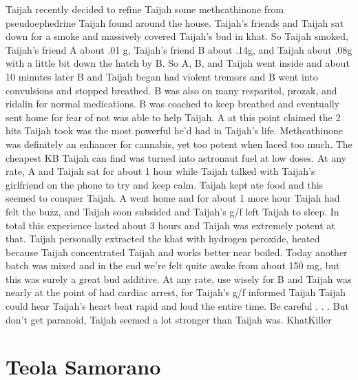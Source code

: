 \documentclass[12pt]{book}
\begin{document}
Taijah recently decided to refine Taijah some methcathinone from pseudoephedrine Taijah found around the house. Taijah's friends and Taijah sat down for a smoke and massively covered Taijah's bud in khat. So Taijah smoked, Taijah's friend A about .01 g, Taijah's friend B about .14g, and Taijah about .08g with a little bit down the hatch by B. So A, B, and Taijah went inside and about 10 minutes later B and Taijah began had violent tremors and B went into convulsions and stopped breathed. B was also on many resparitol, prozak, and ridalin for normal medications. B was coached to keep breathed and eventually sent home for fear of not was able to help Taijah. A at this point claimed the 2 hits Taijah took was the most powerful he'd had in Taijah's life. Methcathinone was definitely an enhancer for cannabis, yet too potent when laced too much. The cheapest KB Taijah can find was turned into astronaut fuel at low doses. At any rate, A and Taijah sat for about 1 hour while Taijah talked with Taijah's girlfriend on the phone to try and keep calm. Taijah kept ate food and this seemed to conquer Taijah. A went home and for about 1 more hour Taijah had felt the buzz, and Taijah soon subsided and Taijah's g/f left Taijah to sleep. In total this experience lasted about 3 hours and Taijah was extremely potent at that. Taijah personally extracted the khat with hydrogen peroxide, heated because Taijah concentrated Taijah and works better near boiled. Today another batch was mixed and in the end we're felt quite awake from about 150 mg, but this was surely a great bud additive. At any rate, use wisely for B and Taijah was nearly at the point of had cardiac arrest, for Taijah's g/f informed Taijah Taijah could hear Taijah's heart beat rapid and loud the entire time. Be careful . . .  But don't get paranoid, Taijah seemed a lot stronger than Taijah was. KhatKiller






\chapter{Teola Samorano}
\end{document}
